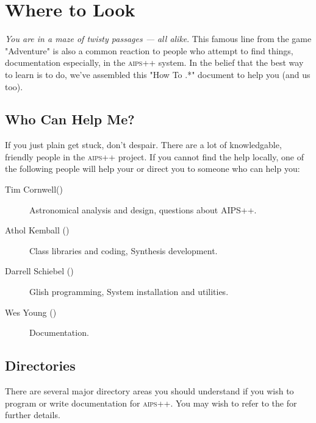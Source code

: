
\chapter{Where to Look\label{HowTo.Intro}}
\textit{You are in a maze of twisty passages --- all alike}. This famous line
from the game "Adventure" is also a common reaction to people who
attempt to find things, documentation especially, in the \textsc{aips++}
system.
In the belief that the
best way to learn is to do, we've assembled this "How To .*" document
to help you (and us too).
\section{Who Can Help Me?}
If you just plain get stuck, don't despair. There are a lot of
knowledgable, friendly people in the \textsc{aips++} project. If you cannot
find the help locally, one of the following people will help your or 
direct you to someone who can help you:

\begin{description} 
\item[Tim Cornwell()]
Astronomical analysis and design, questions about AIPS++.
\item[Athol Kemball ()]
Class libraries and coding, Synthesis development.
\item[Darrell Schiebel ()]
Glish programming, System installation and utilities.
\item[Wes Young ()]
Documentation.
\end{description}

\section{Directories}

There are several major directory areas you should understand if you
wish to program or write documentation for \textsc{aips++}. You may wish
to refer to the 
for further details.

